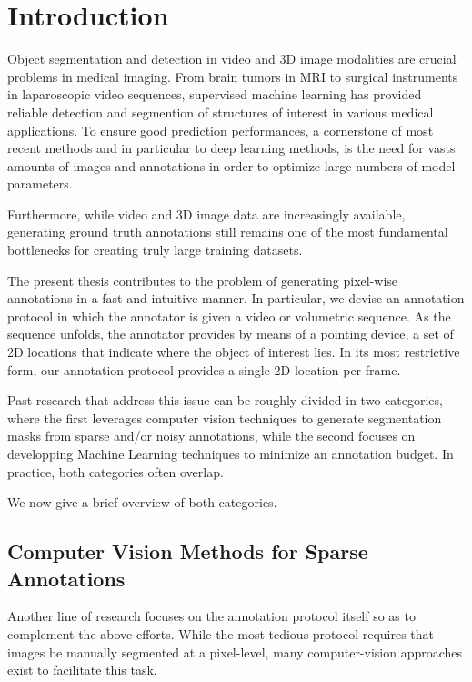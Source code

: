 \chapter{Introduction}

\label{intro}

Object segmentation and detection in video and 3D image modalities are crucial problems in medical imaging.
From brain tumors in MRI to surgical instruments in laparoscopic video sequences, supervised machine learning has provided reliable detection and segmention of structures of interest in various medical applications.
To ensure good prediction performances, a cornerstone of most recent methods and in particular to deep learning methods, is the need for vasts amounts of images and annotations in order to optimize large numbers of model parameters.

Furthermore, while video and 3D image data are increasingly available, generating
ground truth annotations still remains one of the most fundamental bottlenecks
for creating truly large training datasets.

The present thesis contributes to the problem of generating pixel-wise annotations
in a fast and intuitive manner.
In particular, we devise an annotation protocol in which the annotator is given a
video or volumetric sequence.
As the sequence unfolds, the annotator provides by means of a pointing device, a set of 2D locations that indicate where the object of interest lies.
In its most restrictive form, our annotation protocol provides a single 2D location per frame.

Past research that address this issue can be roughly divided in two categories,
where the first leverages computer vision techniques to generate segmentation masks from sparse and/or noisy annotations, while the second focuses on developping Machine Learning techniques to minimize an annotation budget.
In practice, both categories often overlap.

We now give a brief overview of both categories.

\section{Computer Vision Methods for Sparse Annotations}
Another line of research focuses on the annotation protocol itself so as to complement the above efforts.
While the most tedious protocol requires that images be manually segmented at a pixel-level, many computer-vision approaches exist to facilitate this task.

